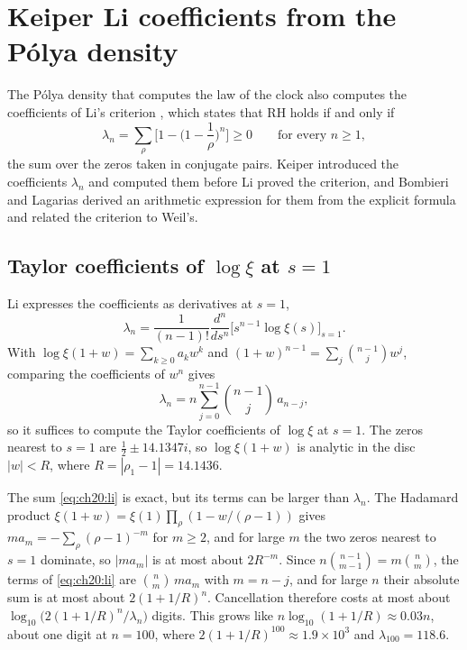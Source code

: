 \section{Keiper Li coefficients from the P\'olya density}\label{ch:li}

The P\'olya density that computes the law of the clock also computes the coefficients of Li's criterion \cite{Li97}, which states that RH holds if and only if
\[
\lambda_n=\sum_\rho\Big[1-\Big(1-\frac1\rho\Big)^n\Big]\ge0\qquad\text{for every }n\ge1,
\]
the sum over the zeros taken in conjugate pairs. Keiper \cite{Keiper92} introduced the coefficients $\lambda_n$ and computed them before Li proved the criterion, and Bombieri and Lagarias \cite{BL99} derived an arithmetic expression for them from the explicit formula and related the criterion to Weil's.

\subsection{Taylor coefficients of \texorpdfstring{$\log\xi$}{log xi} at \texorpdfstring{$s=1$}{s=1}}\label{sec:ch20:compute}

Li \cite{Li97} expresses the coefficients as derivatives at $s=1$,
\[
\lambda_n=\frac1{(n-1)!}\frac{d^n}{ds^n}\Big[s^{n-1}\log\xi(s)\Big]_{s=1}.
\]
With $\log\xi(1+w)=\sum_{k\ge0}a_kw^k$ and $(1+w)^{n-1}=\sum_j\binom{n-1}jw^j$, comparing the coefficients of $w^n$ gives
\begin{equation}\label{eq:ch20:li}
\lambda_n=n\sum_{j=0}^{n-1}\binom{n-1}j\,a_{n-j},
\end{equation}
so it suffices to compute the Taylor coefficients of $\log\xi$ at $s=1$. The zeros nearest to $s=1$ are $\frac12\pm14.1347i$, so $\log\xi(1+w)$ is analytic in the disc $|w|<R$, where $R=|\rho_1-1|=14.1436$.

The sum \eqref{eq:ch20:li} is exact, but its terms can be larger than $\lambda_n$. The Hadamard product $\xi(1+w)=\xi(1)\prod_\rho(1-w/(\rho-1))$ gives $ma_m=-\sum_\rho(\rho-1)^{-m}$ for $m\ge2$, and for large $m$ the two zeros nearest to $s=1$ dominate, so $|ma_m|$ is at most about $2R^{-m}$. Since $n\binom{n-1}{m-1}=m\binom nm$, the terms of \eqref{eq:ch20:li} are $\binom nm\,ma_m$ with $m=n-j$, and for large $n$ their absolute sum is at most about $2(1+1/R)^n$. Cancellation therefore costs at most about $\log_{10}\big(2(1+1/R)^n/\lambda_n\big)$ digits. This grows like $n\log_{10}(1+1/R)\approx0.03n$, about one digit at $n=100$, where $2(1+1/R)^{100}\approx1.9\times10^3$ and $\lambda_{100}=118.6$.

